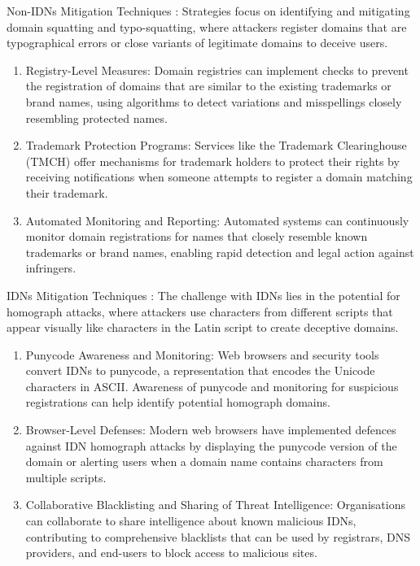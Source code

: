 Non-IDNs Mitigation Techniques : Strategies focus on identifying and mitigating domain squatting and typo-squatting, where attackers register domains that are typographical errors or close variants of legitimate domains to deceive users.

\begin{enumerate}
  \item Registry-Level Measures: Domain registries can implement checks to prevent the registration of domains that are similar to the existing trademarks or brand names, using algorithms to detect variations and misspellings closely resembling protected names. \cite{WTR2020} 
  \item Trademark Protection Programs: Services like the Trademark Clearinghouse (TMCH) offer mechanisms for trademark holders to protect their rights by receiving notifications when someone attempts to register a domain matching their trademark. \cite{ICANNTMCH}
  \item Automated Monitoring and Reporting: Automated systems can continuously monitor domain registrations for names that closely resemble known trademarks or brand names, enabling rapid detection and legal action against infringers. \cite{TMCH2023}
\end{enumerate}

IDNs Mitigation Techniques : The challenge with IDNs lies in the potential for homograph attacks, where attackers use characters from different scripts that appear visually like characters in the Latin script to create deceptive domains.

\begin{enumerate}
  \item Punycode Awareness and Monitoring: Web browsers and security tools convert IDNs to punycode, a representation that encodes the Unicode characters in ASCII. Awareness of punycode and monitoring for suspicious registrations can help identify potential homograph domains. \cite{SOCRadar2023}
  \item Browser-Level Defenses: Modern web browsers have implemented defences against IDN homograph attacks by displaying the punycode version of the domain or alerting users when a domain name contains characters from multiple scripts. \cite{Malwarebytes2017}
  \item Collaborative Blacklisting and Sharing of Threat Intelligence: Organisations can collaborate to share intelligence about known malicious IDNs, contributing to comprehensive blacklists that can be used by registrars, DNS providers, and end-users to block access to malicious sites. \cite{CyberThreatAlliance2023}
  
\end{enumerate}


